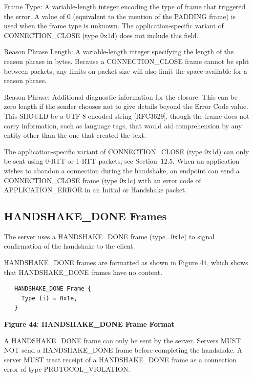 \documentclass{article}
\begin{document}
Frame Type:  A variable-length integer encoding the type of frame that triggered the error.  A value of 0 (equivalent to the mention of the PADDING frame) is used when the frame type is unknown.  The application-specific variant of CONNECTION\_CLOSE (type 0x1d) does not include this field.

Reason Phrase Length:  A variable-length integer specifying the length of the reason phrase in bytes.  Because a CONNECTION\_CLOSE frame cannot be split between packets, any limits on packet size will also limit the space available for a reason phrase.

Reason Phrase:  Additional diagnostic information for the closure. This can be zero length if the sender chooses not to give details beyond the Error Code value.  This SHOULD be a UTF-8 encoded string [RFC3629], though the frame does not carry information, such as language tags, that would aid comprehension by any entity other than the one that created the text.

The application-specific variant of CONNECTION\_CLOSE (type 0x1d) can only be sent using 0-RTT or 1-RTT packets; see Section~12.5.  When an application wishes to abandon a connection during the handshake, an endpoint can send a CONNECTION\_CLOSE frame (type 0x1c) with an error code of APPLICATION\_ERROR in an Initial or Handshake packet.

\subsection{HANDSHAKE\_DONE Frames}

The server uses a HANDSHAKE\_DONE frame (type=0x1e) to signal confirmation of the handshake to the client.

HANDSHAKE\_DONE frames are formatted as shown in Figure 44, which shows that HANDSHAKE\_DONE frames have no content.

\begin{verbatim}
   HANDSHAKE_DONE Frame {
     Type (i) = 0x1e,
   }
\end{verbatim}

\begin{center}
\textbf{Figure 44: HANDSHAKE\_DONE Frame Format}
\end{center}

A HANDSHAKE\_DONE frame can only be sent by the server.  Servers MUST NOT send a HANDSHAKE\_DONE frame before completing the handshake.  A server MUST treat receipt of a HANDSHAKE\_DONE frame as a connection error of type PROTOCOL\_VIOLATION.
\end{document}
